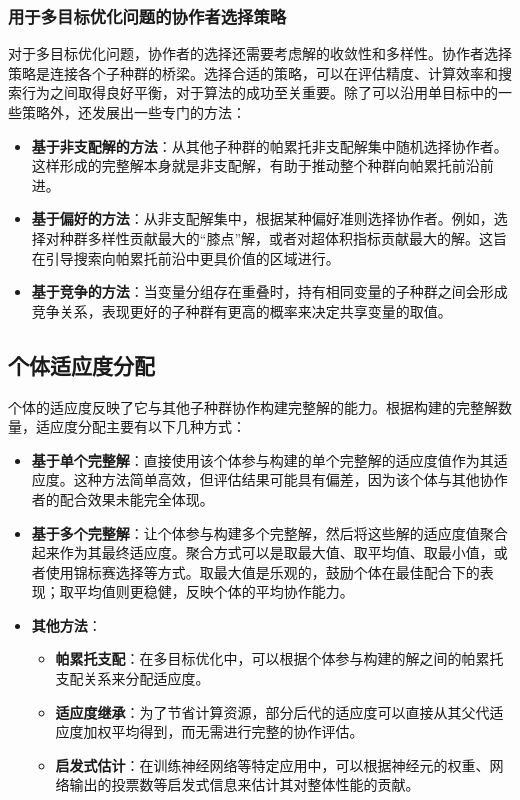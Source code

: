 \subsubsection{用于多目标优化问题的协作者选择策略}
对于多目标优化问题，协作者的选择还需要考虑解的收敛性和多样性。协作者选择策略是连接各个子种群的桥梁。选择合适的策略，可以在评估精度、计算效率和搜索行为之间取得良好平衡，对于算法的成功至关重要。除了可以沿用单目标中的一些策略外，还发展出一些专门的方法：
\begin{itemize}
        \item \textbf{基于非支配解的方法}：从其他子种群的帕累托非支配解集中随机选择协作者。这样形成的完整解本身就是非支配解，有助于推动整个种群向帕累托前沿前进。
        \item \textbf{基于偏好的方法}：从非支配解集中，根据某种偏好准则选择协作者。例如，选择对种群多样性贡献最大的“膝点”解，或者对超体积指标贡献最大的解。这旨在引导搜索向帕累托前沿中更具价值的区域进行。
        \item \textbf{基于竞争的方法}：当变量分组存在重叠时，持有相同变量的子种群之间会形成竞争关系，表现更好的子种群有更高的概率来决定共享变量的取值。
\end{itemize}

\subsection{个体适应度分配}
个体的适应度反映了它与其他子种群协作构建完整解的能力。根据构建的完整解数量，适应度分配主要有以下几种方式：
\begin{itemize}
    \item \textbf{基于单个完整解}：直接使用该个体参与构建的单个完整解的适应度值作为其适应度。这种方法简单高效，但评估结果可能具有偏差，因为该个体与其他协作者的配合效果未能完全体现。
    \item \textbf{基于多个完整解}：让个体参与构建多个完整解，然后将这些解的适应度值聚合起来作为其最终适应度。聚合方式可以是取最大值、取平均值、取最小值，或者使用锦标赛选择等方式。取最大值是乐观的，鼓励个体在最佳配合下的表现；取平均值则更稳健，反映个体的平均协作能力。
    \item \textbf{其他方法}：
            \begin{itemize}
                \item \textbf{帕累托支配}：在多目标优化中，可以根据个体参与构建的解之间的帕累托支配关系来分配适应度。
                \item \textbf{适应度继承}：为了节省计算资源，部分后代的适应度可以直接从其父代适应度加权平均得到，而无需进行完整的协作评估。
                \item \textbf{启发式估计}：在训练神经网络等特定应用中，可以根据神经元的权重、网络输出的投票数等启发式信息来估计其对整体性能的贡献。
            \end{itemize}
\end{itemize}

